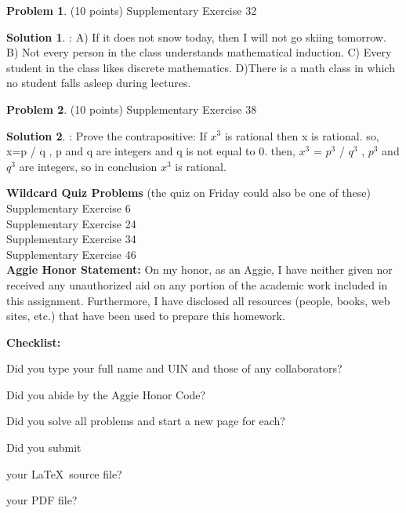 \documentclass{article}
\theoremstyle{definition}
\newtheorem{problem}{Problem}
\newtheorem*{solution}{Solution}
\newcommand{\honor}{\noindent \textbf{Aggie Honor Statement: }On my honor, as an Aggie, I have neither
  given nor received any unauthorized aid on any portion of the
  academic work included in this assignment. Furthermore, I have
  disclosed all resources (people, books, web sites, etc.) that have
  been used to prepare this homework. 
}
\newcommand{\checklist}{\noindent\textbf{Checklist:}
\begin{compactenum}
\item Did you type your full name and UIN and those of any collaborators? 
\item Did you abide by the Aggie Honor Code?
\item Did you solve all problems and start a new page for each? 
\item Did you submit
\begin{compactenum}
\item your \LaTeX\ source file?
\item your  PDF file?
\end{compactenum}
\end{compactenum}
}
\begin{document}
\newpage

\begin{problem} (10 points) 
Supplementary Exercise 32
\end{problem}
\begin{solution}:
\newline
A) If it does not snow today, then I will not go skiing tomorrow. 
\newline
B) Not every person in the class understands mathematical induction.
\newline
C) Every student in the class likes discrete mathematics.
\newline
D)There is a math class in which no student falls asleep during lectures.
\end{solution}

\newpage

\begin{problem} (10 points) 
Supplementary Exercise 38
\end{problem}
\begin{solution}:
\newline
Prove the contrapositive: If $x^3$ is rational then x is rational.
\newline
so, x=p / q , p and q are integers and q is not equal to 0.
\newline
then, $x^3$ = $p^3$ / $q^3$ ,  $p^3$ and $q^3$ are integers,  so in conclusion $x^3$ is rational.
\end{solution}

\newpage 

\goodbreak
\noindent
\textbf{Wildcard Quiz Problems} (the quiz on Friday could also be one of these)\\
Supplementary Exercise 6\\
Supplementary Exercise 24\\
Supplementary Exercise 34\\
Supplementary Exercise 46\\


\goodbreak
\honor

\bigskip
\checklist
\end{document}
